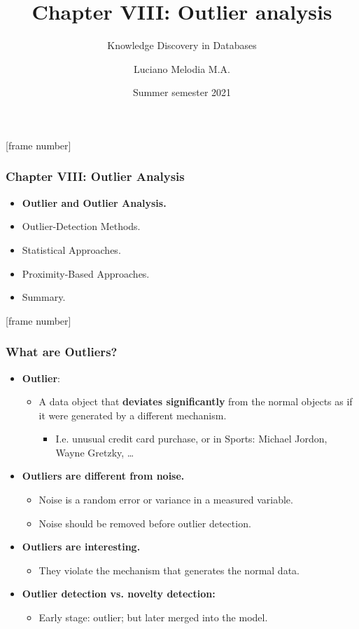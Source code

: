 \documentclass[aspectratio=169,t,xcolor=dvipsnames]{beamer}
\title[KDD]{Chapter VIII: Outlier analysis}
\subtitle{Knowledge Discovery in Databases}
\author[L.~Melodia]{Luciano Melodia M.A.}
\institute[Department]{Evolutionary Data Management, Friedrich-Alexander University Erlangen-Nürnberg}
\date{Summer semester 2021}
\begin{document}
\def\tikzoverlay{%
   \tikz[baseline,overlay]\node[every overlay node]
}%

  \maketitle
{  [frame number]
\begin{frame}
	\frametitle{Chapter VIII: Outlier Analysis}
	\begin{itemize}
		\item \textbf{Outlier and Outlier Analysis.}
		\item Outlier-Detection Methods.
		\item Statistical Approaches.
		\item Proximity-Based Approaches.
		\item Summary.
	\end{itemize}
\end{frame}
}

{  [frame number]
\begin{frame}
   \frametitle{What are Outliers?}
   \begin{itemize}
   	\item \textbf{Outlier}:
   	\begin{itemize}
   		\item A data object that \textbf{\color{airforceblue}deviates significantly} from the normal objects as if it were generated by a different mechanism.
 		\begin{itemize}
 			\item I.e. unusual credit card purchase, or in Sports: Michael Jordon, Wayne Gretzky, \ldots
 		\end{itemize}
   	\end{itemize}
	\item \textbf{Outliers are different from noise.}
		\begin{itemize}
			\item Noise is a random error or variance in a measured variable.
			\item Noise should be removed before outlier detection.
		\end{itemize}
	\item \textbf{Outliers are interesting.}
		\begin{itemize}
			\item They violate the mechanism that generates the normal data.
		\end{itemize}
	\item \textbf{Outlier detection vs. novelty detection:}
		\begin{itemize}
			\item Early stage: outlier; but later merged into the model.
   		\end{itemize}
   \end{itemize}
\end{frame}
}
\end{document}
